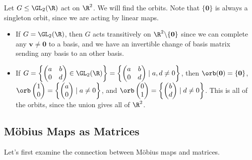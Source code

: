 \documentclass[a4paper]{scrartcl}
\newcommand{\newsection}{\subsection}
\begin{document}
\begin{example}
	Let $G \leq \GL_2(\R)$ act on $\R^2$. We will find the orbits. 
	Note that $\{\mathbf{0}\}$ is always a singleton orbit, since we are acting by linear maps.
	
\begin{itemize}
	\item If $G = \GL_2(\R)$, then $G$ acts transitively on $\R^2\backslash \{\mathbf{0}\}$ since we can complete any $\mathbf{v} \neq \mathbf{0}$ to a basis, and we have an invertible change of basis matrix sending any basis to an other basis.
	\item If $G = \left\{\begin{pmatrix}
		a & b \\ 0 & d
	\end{pmatrix} \in \GL_2(\R)\right\} =\left\{ \begin{pmatrix}
		a & b \\
		0 & d
	\end{pmatrix} \mid a, d \neq 0 \right\}$, then $\orb(\mathbf{0}) = \{\mathbf{0}\}$, $\orb\begin{pmatrix}
		1 \\ 0
	\end{pmatrix} = \left\{\begin{pmatrix}
		a \\ 0
	\end{pmatrix} \mid a \neq 0 \right\}$, and $\orb\begin{pmatrix}
		0 \\ 1
	\end{pmatrix} =\left \{\begin{pmatrix}
		b\\ d
	\end{pmatrix} \mid d \neq 0 \right\}$. This is all of the orbits, since the union gives all of $\R^2$.
\end{itemize}
\end{example}

\newsection{Möbius Maps as Matrices}

Let's first examine the connection between Möbius maps and matrices.
\end{document}
